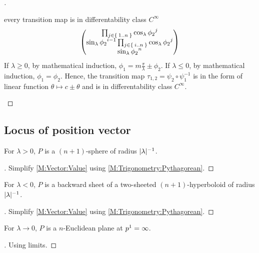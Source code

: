 \documentclass[../main.tex]{subfiles}
\begin{document}
\begin{proof}[]
\begin{subproof}{every transition map is in differentability class $C^\infty$}
\begin{align*}
\begin{pmatrix}
\prod_{j\in\Set{1..n}}{\cos_\lambda{\tensor{{\phi_2}}{^j}}}\\
\sin_\lambda{\tensor{{\phi_2}}{^{i-1}}}\prod_{j\in\Set{i..n}}{\cos_\lambda{\tensor{{\phi_2}}{^j}}}\\
\sin_\lambda{{\tensor{{\phi_2}}{^n}}}\\
\end{pmatrix}
\end{align*}
If $\lambda\ge 0$, by mathematical induction, $\phi_1=m\frac{\pi}{\lambda}\pm\phi_2$.
If $\lambda\le 0$, by mathematical induction, $\phi_1 =\phi_2$.
Hence, the transition map $\tau_{1,2} =\psi_2\circ\psi_1^{-1}$
is in the form of linear function $\theta\mapsto c\pm\theta$
and is in differentability class $C^\infty$.
\end{subproof}
\end{proof}
\subsection{Locus of position vector}
\begin{lemma}\label{SphericalLocus}
For $\lambda>0$, $P$ is a $\left(n+1\right)$-sphere of radius $\lvert\lambda\rvert^{-1}$.
\end{lemma}
\begin{proof}[]
Simplify \cref{M:Vector:Value} using \cref{M:Trigonometry:Pythagorean}.
\end{proof}
\begin{lemma}\label{HyperbolicLocus}
For $\lambda<0$, $P$ is a backward sheet of a two-sheeted $\left(n+1\right)$-hyperboloid of radius $\lvert\lambda\rvert^{-1}$.
\end{lemma}
\begin{proof}[]
Simplify \cref{M:Vector:Value} using \cref{M:Trigonometry:Pythagorean}.
\end{proof}
\begin{lemma}\label{EuclideanLocus}
For $\lambda\to0$, $P$ is a $n$-Euclidean plane at $\tensor{p}{^1}=\infty$.
\end{lemma}
\begin{proof}[]
Using limits.
\end{proof}
\end{document}

